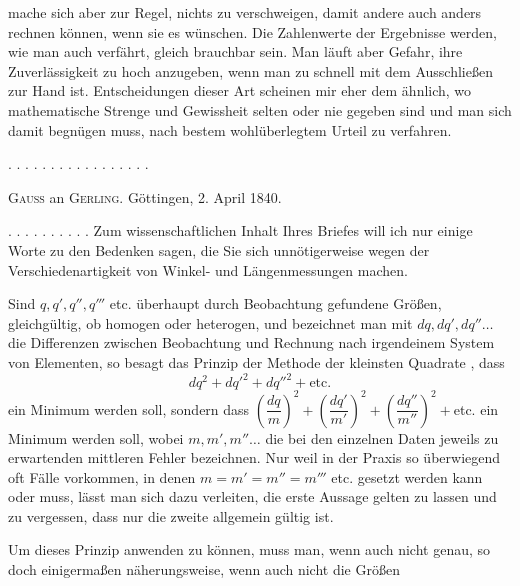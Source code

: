 mache sich aber zur Regel, nichts zu verschweigen, damit andere auch anders rechnen können, wenn sie es wünschen. Die Zahlenwerte der Ergebnisse werden, wie man auch verfährt, gleich brauchbar sein. Man läuft aber Gefahr, ihre Zuverlässigkeit zu hoch anzugeben, wenn man zu schnell mit dem Ausschließen zur Hand ist. Entscheidungen dieser Art scheinen mir eher dem  ähnlich, wo mathematische Strenge und Gewissheit selten oder nie gegeben sind und man sich damit begnügen muss, nach bestem wohlüberlegtem Urteil zu verfahren.

\begin{center}
. . . . . . . . . . . . . . . . .
\end{center}



\begin{center}
\textsc{Gauss} an \textsc{Gerling}. Göttingen, 2. April 1840.
\end{center}

. . . . . . . . . . Zum wissenschaftlichen Inhalt Ihres Briefes will ich nur einige Worte zu den Bedenken sagen, die Sie sich unnötigerweise wegen der Verschiedenartigkeit von Winkel- und Längenmessungen machen.

Sind $q, q', q'', q'''$ etc. überhaupt durch Beobachtung gefundene Größen, gleichgültig, ob homogen oder heterogen, und bezeichnet man mit $dq, dq', dq''\ldots$ die Differenzen zwischen Beobachtung und Rechnung nach irgendeinem System von Elementen, so besagt das Prinzip der Methode der kleinsten Quadrate , dass
\[
dq^2+dq'^2+dq''^2+\text{etc.}
\]
ein Minimum werden soll, sondern dass
$\left(\dfrac{dq}{m}\right)^2+\left(\dfrac{dq'}{m'}\right)^2+\left(\dfrac{dq''}{m''}\right)^2+$etc.
ein Minimum werden soll, wobei $m, m', m''\ldots$ die bei den einzelnen Daten jeweils zu erwartenden mittleren Fehler bezeichnen. Nur weil in der Praxis so überwiegend oft Fälle vorkommen, in denen $m=m'=m''=m'''$ etc. gesetzt werden kann oder muss, lässt man sich dazu verleiten, die erste Aussage gelten zu lassen und zu vergessen, dass nur die zweite allgemein gültig ist.

Um dieses Prinzip anwenden zu können, muss man, wenn auch nicht genau, so doch einigermaßen näherungsweise, wenn auch nicht die Größen
